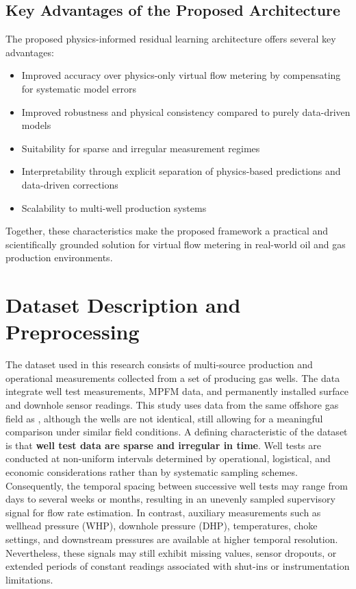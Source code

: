 \documentclass[12pt,APA]{uomthesis}
\begin{document}
\subsection{Key Advantages of the Proposed Architecture}
The proposed physics-informed residual learning architecture offers several key advantages:

\begin{itemize}
    \item Improved accuracy over physics-only virtual flow metering by compensating for systematic model errors
    \item Improved robustness and physical consistency compared to purely data-driven models
    \item Suitability for sparse and irregular measurement regimes
    \item Interpretability through explicit separation of physics-based predictions and data-driven corrections
    \item Scalability to multi-well production systems
\end{itemize}

Together, these characteristics make the proposed framework a practical and scientifically grounded solution for virtual flow metering in real-world oil and gas production environments.


\section{Dataset Description and Preprocessing}
\label{sec:data_preprocessing}
The dataset used in this research consists of multi-source production and operational measurements collected from a set of producing gas wells. The data integrate well test measurements, MPFM data, and permanently installed surface and downhole sensor readings. 
This study uses data from the same offshore gas field as \citep{nemoto2023cloud}, although the wells are not identical, still allowing for a meaningful comparison under similar field conditions.
A defining characteristic of the dataset is that \textbf{well test data are sparse and irregular in time}. Well tests are conducted at non-uniform intervals determined by operational, logistical, and economic considerations rather than by systematic sampling schemes. 
Consequently, the temporal spacing between successive well tests may range from days to several weeks or months, resulting in an unevenly sampled supervisory signal for flow rate estimation.
In contrast, auxiliary measurements such as wellhead pressure (WHP), downhole pressure (DHP), temperatures, choke settings, and downstream pressures are available at higher temporal resolution. 
Nevertheless, these signals may still exhibit missing values, sensor dropouts, or extended periods of constant readings associated with shut-ins or instrumentation limitations.
\end{document}
